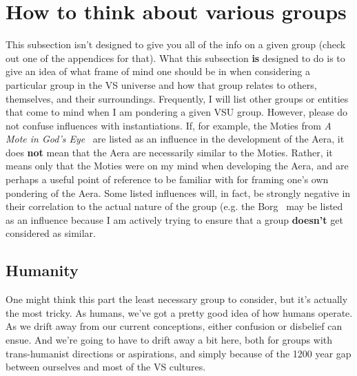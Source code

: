 \label{chapt:livinginVSU}
\section{How to think about various groups}
\label{sec:groupintuitions}
This subsection isn't designed to give you all of the info on a given
group (check out one of the appendices for that). What this subsection
{\bf is} designed to do is to give an idea of what frame of mind one
should be in when considering a particular group in the VS universe
and how that group relates to others, themselves, and their
surroundings. Frequently, I will list other groups or entities that
come to mind when I am pondering a given VSU group. However, please do
not confuse influences with instantiations. If, for example, the
Moties from {\em A Mote in God's
Eye}~\cite{NivenPournelle-MoteInGodsEye} are listed as an influence in
the development of the Aera, it does {\bf not} mean that the Aera are
necessarily similar to the Moties. Rather, it means only that the
Moties were on my mind when developing the Aera, and are perhaps a
useful point of reference to be familiar with for framing one's own
pondering of the Aera. Some listed influences will, in fact, be
strongly negative in their correlation to the actual nature of the
group (e.g. the Borg~\cite{StarTrek-Borg} may be listed as an
influence because I am actively trying to ensure that a group {\bf
doesn't} get considered as similar.

\subsection{Humanity}

One might think this part the least necessary group to consider, but
it's actually the most tricky. As humans, we've got a pretty good idea
of how humans operate. As we drift away from our current conceptions,
either confusion or disbelief can ensue. And we're going to have to
drift away a bit here, both for groups with trans-humanist directions
or aspirations, and simply because of the 1200 year gap between
ourselves and most of the VS cultures.

